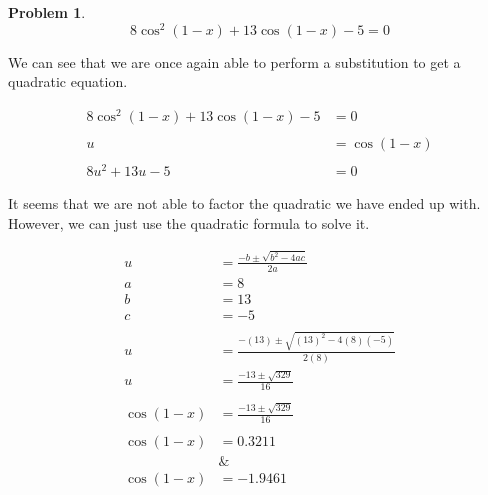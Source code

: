 \documentclass[12pt]{article}
\theoremstyle{definition}
\newtheorem{problem}{Problem}
\begin{document}
\begin{problem}
\begin{equation*}
    8\cos^2(1-x) + 13\cos(1-x) - 5 = 0  \label{eq:17}
\end{equation*}
\end{problem}

We can see that we are once again able to perform a substitution to get a quadratic equation.

\begin{align}
    8\cos^2(1-x) + 13\cos(1-x) - 5 & = 0         \\
    \nonumber                                    \\
    u                              & = \cos(1-x) \\
    \nonumber                                    \\
    8u^2 + 13u - 5                 & = 0
\end{align}

It seems that we are not able to factor the quadratic we have ended up with.
However, we can just use the quadratic formula to solve it.

\begin{align}
    u         & = \frac{-b\pm\sqrt{b^2-4ac}}{2a}              \\
    a         & = 8                                           \\
    b         & = 13                                          \\
    c         & = -5                                          \\
    \nonumber                                                 \\
    u         & = \frac{-(13)\pm\sqrt{(13)^2-4(8)(-5)}}{2(8)} \\
    u         & = \frac{-13\pm\sqrt{329}}{16}                 \\
    \nonumber                                                 \\
    \cos(1-x) & = \frac{-13\pm\sqrt{329}}{16}                 \\
    \nonumber                                                 \\
    \cos(1-x) & = 0.3211                                      \\
    \nonumber & \&                                            \\
    \cos(1-x) & = -1.9461
\end{align}
\end{document}
